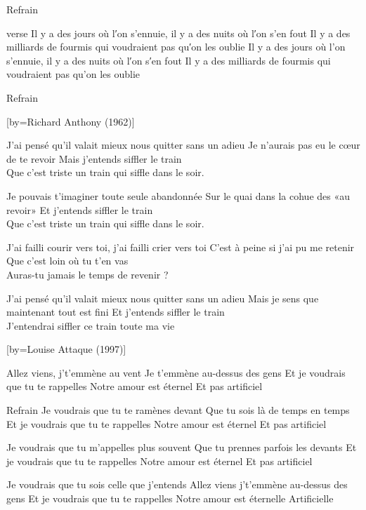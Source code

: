 \beginverse
Refrain
\endverse

\beginverse
verse
Il y a des jours où l′on s'ennuie, il y a des nuits où l′on s'en fout
Il y a des milliards de fourmis qui voudraient pas qu′on les oublie
Il y a des jours où l'on s'ennuie, il y a des nuits où l′on s′en fout
Il y a des milliards de fourmis qui voudraient pas qu'on les oublie
\endverse

\beginverse
Refrain \\[bis]
\endverse

[by={Richard Anthony (1962)}]

\beginverse
J'ai pensé qu'il valait mieux nous quitter sans un adieu
Je n'aurais pas eu le cœur de te revoir
Mais j'entends siffler le train \\[bis]
Que c'est triste un train qui siffle dans le soir.
\endverse

\beginverse
Je pouvais t'imaginer toute seule abandonnée
Sur le quai dans la cohue des «au revoir»
Et j'entends siffler le train \\[bis]
Que c'est triste un train qui siffle dans le soir.
\endverse

\beginverse
J'ai failli courir vers toi, j'ai failli crier vers toi
C'est à peine si j'ai pu me retenir
Que c'est loin où tu t'en vas \\[bis]
Auras-tu jamais le temps de revenir ?
\endverse

\beginverse
J'ai pensé qu'il valait mieux nous quitter sans un adieu
Mais je sens que maintenant tout est fini
Et j'entends siffler le train \\[bis]
J'entendrai siffler ce train toute ma vie \\[bis]
\endverse

[by={Louise Attaque (1997)}]

\beginverse
Allez viens, j't'emmène au vent
Je t'emmène au-dessus des gens
Et je voudrais que tu te rappelles
Notre amour est éternel
Et pas artificiel
\endverse

\beginverse
Refrain
Je voudrais que tu te ramènes devant
Que tu sois là de temps en temps
Et je voudrais que tu te rappelles
Notre amour est éternel
Et pas artificiel
\endverse

\beginverse
Je voudrais que tu m'appelles plus souvent
Que tu prennes parfois les devants
Et je voudrais que tu te rappelles
Notre amour est éternel
Et pas artificiel
\endverse

\beginverse
Je voudrais que tu sois celle que j'entends
Allez viens j't'emmène au-dessus des gens
Et je voudrais que tu te rappelles
Notre amour est éternelle
Artificielle
\endverse

